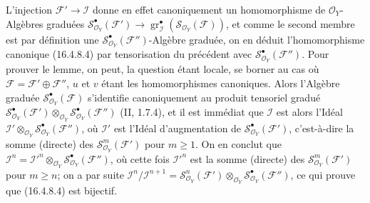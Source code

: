 L'injection $\mathscr{F}'\to\mathscr{I}$ donne en effet canoniquement un
homomorphisme de $\mathcal{O}_Y$-Algèbres graduées\linebreak
$\mathscr{S}_{\mathcal{O}_Y}^{\bullet}(\mathscr{F}')\to\allowbreak
\operatorname{gr}_{\mathscr{I}}^\bullet
(\mathscr{S}_{\mathcal{O}_Y}(\mathscr{F}))$, et comme le second membre est par
définition une $\mathscr{S}_{\mathcal{O}_Y}^{\bullet}(\mathscr{F}'')$-Algèbre
graduée, on en déduit l'homomorphisme canonique (16.4.8.4) par tensorisation du
précédent avec $\mathscr{S}_{\mathcal{O}_Y}^{\bullet}(\mathscr{F}'')$. Pour
prouver le lemme, on peut, la question étant locale, se borner au cas où
$\mathscr{F}=\mathscr{F}'\oplus\mathscr{F}''$, $u$ et $v$ étant les
homomorphismes canoniques. Alors l'Algèbre graduée
$\mathscr{S}_{\mathcal{O}_Y}^{\bullet}(\mathscr{F})$ s'identifie canoniquement au
produit tensoriel gradué
$\mathscr{S}_{\mathcal{O}_Y}^{\bullet}(\mathscr{F}')
\otimes_{\mathcal{O}_Y}
\mathscr{S}_{\mathcal{O}_Y}^{\bullet}(\mathscr{F}'')$ (II, 1.7.4), et il est
immédiat que $\mathscr{I}$ est alors l'Idéal
$\mathscr{I}'\otimes_{\mathcal{O}_Y}
\mathscr{S}_{\mathcal{O}_Y}^{\bullet}(\mathscr{F}'')$, où $\mathscr{I}'$ est
l'Idéal d'augmentation de
$\mathscr{S}_{\mathcal{O}_Y}^{\bullet}(\mathscr{F}')$, c'est-à-dire la somme
(directe) des $\mathscr{S}_{\mathcal{O}_Y}^m(\mathscr{F}')$ pour $m\geq1$. On en
conclut que $\mathscr{I}^n=\mathscr{I}'^n\otimes_{\mathcal{O}_Y}
\mathscr{S}_{\mathcal{O}_Y}^{\bullet}(\mathscr{F}'')$, où cette fois
$\mathscr{I}'^n$ est la somme (directe) des
$\mathscr{S}_{\mathcal{O}_Y}^m(\mathscr{F}')$ pour $m\geq n$; on a par suite
$\mathscr{I}^n/\mathscr{I}^{n+1}=
\mathscr{S}_{\mathcal{O}_Y}^n(\mathscr{F}')\otimes_{\mathcal{O}_Y}
\mathscr{S}_{\mathcal{O}_Y}^{\bullet}(\mathscr{F}'')$, ce qui prouve que
(16.4.8.4) est bijectif.

